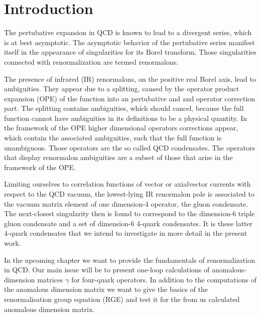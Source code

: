\chapter{Introduction}
The pertubative expansion in QCD is known to lead to a divergent series, which is at best asymptotic. The asymptotic behavior of the pertubative series manifest itself in the appearance of singularities for its Borel transform. Those singularities connected with renormalization are termed renormalons.
\par
The presence of infrared (IR) renormalons, on the positive real Borel axis, lead to ambiguities. They appear due to a splitting, caused by the operator product expansion (OPE) of the function into an pertubative and and operator correction part. The splitting contains ambiguities, which should cancel, because the full function cannot have ambiguities in its definitions to be a physical quantity. In the framework of the OPE higher dimensional operators corrections appear, which contain the associated ambiguities, such that the full function is unambiguous. Those operators are the so called QCD condensates. The operators that display renormalon ambiguities are a subset of those that arise in the framework of the OPE.
\par 
Limiting ourselves to correlation functions of vector or axialvector currents with respect to the QCD vacuum, the lowest-lying IR renormalon pole is associated to the vacuum matrix element of one dimension-4 operator, the gluon condensate. The next-closest singularity then is found to correspond to the dimension-6 triple gluon condensate and a set of dimension-6 4-quark condensates. It is these latter 4-quark condensates that we intend to investigate in more detail in the present work.
\par
In the upcoming chapter we want to provide the fundamentals of renormalization in QCD. Our main issue will be to present one-loop calculations of anomalous-dimension matrices $\gamma$ for four-quark operators. In addition to the computations of the anomalous dimension matrix we want to give the basics of the renormalisation group equation (RGE) and test it for the from us calculated anomalous dimension matrix.
